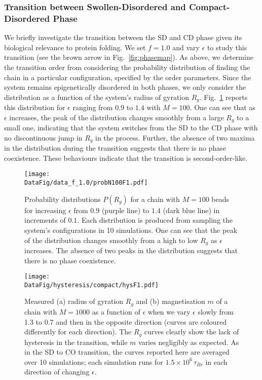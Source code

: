 \documentclass[12pt]{article}
\newcommand*{\DataFig}{/Users/MichaelChiang/Desktop/epigenetics_data/}
\begin{document}
\subsubsection{Transition between Swollen-Disordered and Compact-Disordered Phase}
We briefly investigate the transition between the SD and CD phase given its biological relevance to protein folding. We set $f = 1.0$ and vary $\epsilon$ to study this transition (see the brown arrow in Fig.~\ref{fig:phasemap}). As above, we determine the transition order from considering the probability distribution of finding the chain in a particular configuration, specified by the order parameters. Since the system remains epigenetically disordered in both phases, we only consider the distribution as a function of the system's radius of gyration $R_g$. Fig.~\ref{fig:probN100F1} reports this distribution for $\epsilon$ ranging from $0.9$ to $1.4$ with $M = 100$. One can see that as $\epsilon$ increases, the peak of the distribution changes smoothly from a large $R_g$ to a small one, indicating that the system switches from the SD to the CD phase with no discontinuous jump in $R_g$ in the process. Further, the absence of two maxima in the distribution during the transition suggests that there is no phase coexistence. These behaviours indicate that the transition is second-order-like. 
\begin{figure}[h]
\centering
\texttt{[image: \\DataFig/data\_f\_1.0/probN100F1.pdf]}
\caption{Probability distributions $P(R_g)$ for a chain with $M = 100$ beads for increasing $\epsilon$ from $0.9$ (purple line) to $1.4$ (dark blue line) in increments of $0.1$. Each distribution is produced from sampling the system's configurations in 10 simulations. One can see that the peak of the distribution changes smoothly from a high to low $R_g$ as $\epsilon$ increases. The absence of two peaks in the distribution suggests that there is no phase coexistence.}
	\label{fig:probN100F1}
\end{figure}
\begin{figure}[h]
\centering
\texttt{[image: \\DataFig/hysteresis/compact/hysF1.pdf]}
\caption{Measured (a) radius of gyration $R_g$ and (b) magnetisation $m$ of a chain with $M = 1000$ as a function of $\epsilon$ when we vary $\epsilon$ slowly from 1.3 to 0.7 and then in the opposite direction (curves are coloured differently for each direction). The $R_g$ curves clearly show the lack of hysteresis in the transition, while $m$ varies negligibly as expected. As in the SD to CO transition, the curves reported here are averaged over 10 simulations; each simulation runs for $1.5\times10^6\,\tau_{Br}$ in each direction of changing $\epsilon$.}
	\label{fig:hysF1}
\end{figure}
\end{document}
